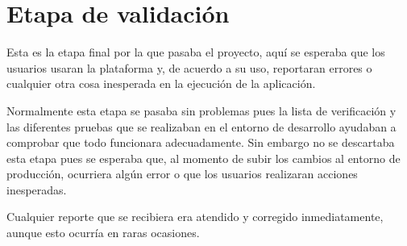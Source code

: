 \section{Etapa de validación}
Esta es la etapa final por la que pasaba el proyecto, aquí se esperaba que los usuarios usaran la plataforma y, de acuerdo a su uso, reportaran errores o cualquier otra cosa inesperada en la ejecución de la aplicación.

Normalmente esta etapa se pasaba sin problemas pues la lista de verificación y las diferentes pruebas que se realizaban en el entorno de desarrollo ayudaban a comprobar que todo funcionara adecuadamente. Sin embargo no se descartaba esta etapa pues se esperaba que, al momento de subir los cambios al entorno de producción, ocurriera algún error o que los usuarios realizaran acciones inesperadas. 

Cualquier reporte que se recibiera era atendido y corregido inmediatamente, aunque esto ocurría en raras ocasiones.